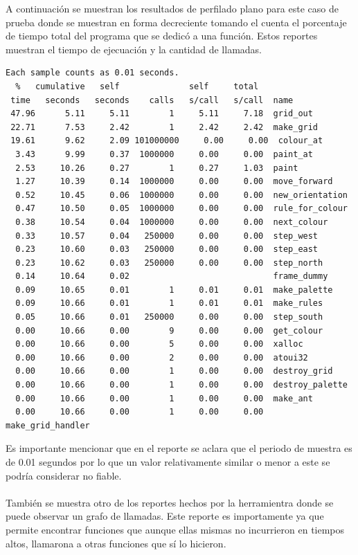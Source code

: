 \documentclass[a4paper, 10pt, twoside, notitlepage]{article}
\begin{document}
A continuación se muestran los resultados de perfilado plano para este caso de prueba donde se muestran en forma decreciente tomando el cuenta el porcentaje de tiempo total del programa que se dedicó a una función. Estos reportes muestran el tiempo de ejecuación y la cantidad de llamadas. 
\scriptsize
\begin{verbatim}
Each sample counts as 0.01 seconds.
  %   cumulative   self              self     total           
 time   seconds   seconds    calls   s/call   s/call  name    
 47.96      5.11     5.11        1     5.11     7.18  grid_out
 22.71      7.53     2.42        1     2.42     2.42  make_grid
 19.61      9.62     2.09 101000000     0.00     0.00  colour_at
  3.43      9.99     0.37  1000000     0.00     0.00  paint_at
  2.53     10.26     0.27        1     0.27     1.03  paint
  1.27     10.39     0.14  1000000     0.00     0.00  move_forward
  0.52     10.45     0.06  1000000     0.00     0.00  new_orientation
  0.47     10.50     0.05  1000000     0.00     0.00  rule_for_colour
  0.38     10.54     0.04  1000000     0.00     0.00  next_colour
  0.33     10.57     0.04   250000     0.00     0.00  step_west
  0.23     10.60     0.03   250000     0.00     0.00  step_east
  0.23     10.62     0.03   250000     0.00     0.00  step_north
  0.14     10.64     0.02                             frame_dummy
  0.09     10.65     0.01        1     0.01     0.01  make_palette
  0.09     10.66     0.01        1     0.01     0.01  make_rules
  0.05     10.66     0.01   250000     0.00     0.00  step_south
  0.00     10.66     0.00        9     0.00     0.00  get_colour
  0.00     10.66     0.00        5     0.00     0.00  xalloc
  0.00     10.66     0.00        2     0.00     0.00  atoui32
  0.00     10.66     0.00        1     0.00     0.00  destroy_grid
  0.00     10.66     0.00        1     0.00     0.00  destroy_palette
  0.00     10.66     0.00        1     0.00     0.00  make_ant
  0.00     10.66     0.00        1     0.00     0.00  make_grid_handler

\end{verbatim}
\normalsize
Es importante mencionar que en el reporte se aclara que el periodo de muestra es de 0.01 segundos por lo que un valor relativamente similar o menor a este se podría considerar no fiable.\\
\\
También se muestra otro de los reportes hechos por la herramientra donde se puede observar un grafo de llamadas. Este reporte es importamente ya que permite encontrar funciones que aunque ellas mismas no incurrieron en tiempos altos, llamarona a otras funciones que sí lo hicieron.
\end{document}

